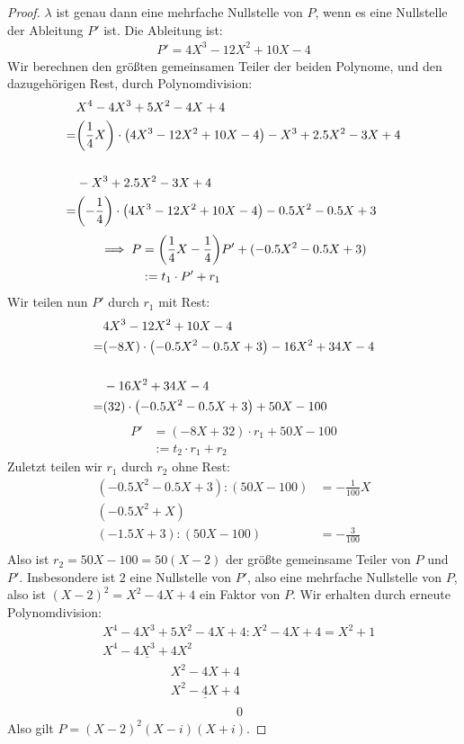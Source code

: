 \documentclass{article}
\begin{document}
		\begin{proof}
			$\lambda$ ist genau dann eine mehrfache Nullstelle von $P$, wenn es eine Nullstelle der Ableitung $P'$ ist. Die Ableitung ist:
			\begin{align*}
				P' = 4X^3 - 12X^2 + 10X - 4
			\end{align*}
			Wir berechnen den größten gemeinsamen Teiler der beiden Polynome, und den dazugehörigen Rest, durch Polynomdivision:
			\begin{align*}
				&X^4 - 4X^3 + 5X^2 - 4X + 4\\
				= &\qty(\frac{1}{4} X) \cdot \qty(4X^3 - 12X^2 + 10X - 4) - X^3 + 2.5X^2 - 3X + 4\\
				\\
				&-X^3 + 2.5X^2 - 3X + 4\\
				= &\qty(- \frac{1}{4}) \cdot \qty(4X^3 - 12X^2 + 10X - 4) - 0.5X^2 - 0.5X + 3
			\end{align*}
			\begin{align*}
				\implies P &= \qty(\frac{1}{4}X - \frac{1}{4}) P' + (- 0.5X^2 - 0.5X + 3)\\
				&:= t_1 \cdot P' + r_1
			\end{align*}
			Wir teilen nun $P'$ durch $r_1$ mit Rest:
			\begin{align*}
				&4X^3 - 12X^2 + 10X - 4\\ 
				= &\qty(-8X) \cdot \qty(- 0.5X^2 - 0.5X + 3) - 16X^2 + 34X - 4\\
				\\
				&-16X^2 + 34X - 4\\
				=&\qty(32) \cdot \qty(- 0.5X^2 - 0.5X + 3) + 50X - 100\\
			\end{align*}
			\begin{align*}
				P' 
				&= (-8X + 32) \cdot r_1 + 50X - 100\\
				&:= t_2 \cdot r_1 + r_2
			\end{align*}
			Zuletzt teilen wir $r_1$ durch $r_2$ ohne Rest:
			\begin{align*}
				(- 0.5X^2 - 0.5X + 3) : (50X - 100) &= -\frac{1}{100}X\\
				(-0.5X^2 + X)\\
				(-1.5X + 3): (50X - 100) &= -\frac{3}{100}\\
			\end{align*}
			Also ist $r_2 = 50X - 100 = 50 (X - 2)$ der größte gemeinsame Teiler von $P$ und $P'$. Insbesondere ist $2$ eine Nullstelle von $P'$, also eine mehrfache Nullstelle von $P$, also ist $(X-2)^2 = X^2 - 4X + 4$ ein Faktor von $P$. Wir erhalten durch erneute Polynomdivision:
			\begin{align*}
				&X^4 - 4X^3 + 5X^2 - 4X + 4 : X^2 - 4X + 4 = X^2 + 1\\
				&\underline{X^4 - 4X^3 + 4X^2}\\
				&\phantom{X^4 - X^3 + 4} X^2 - 4X + 4\\
				&\phantom{X^4 - X^3 + 4} \underline{X^2 - 4X + 4}\\
				&\phantom{X^4 - X^3 + 4 X^2 - 4X +}~0
			\end{align*}
			Also gilt $P = (X-2)^2(X-i)(X+i)$.
		\end{proof}
	\clearpage
\end{document}
